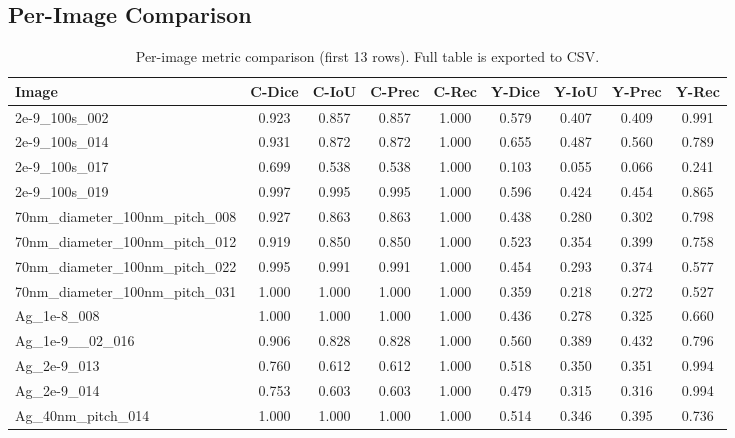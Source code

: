 \documentclass[11pt,a4paper]{article}
\begin{document}
\subsection*{Per-Image Comparison}
\begin{table}[H]
\centering
\scriptsize
\begin{tabular}{lcccccccc}
\toprule
Image & C-Dice & C-IoU & C-Prec & C-Rec & Y-Dice & Y-IoU & Y-Prec & Y-Rec \\
\midrule
2e-9\_100s\_002 & 0.923 & 0.857 & 0.857 & 1.000 & 0.579 & 0.407 & 0.409 & 0.991 \\

2e-9\_100s\_014 & 0.931 & 0.872 & 0.872 & 1.000 & 0.655 & 0.487 & 0.560 & 0.789 \\

2e-9\_100s\_017 & 0.699 & 0.538 & 0.538 & 1.000 & 0.103 & 0.055 & 0.066 & 0.241 \\

2e-9\_100s\_019 & 0.997 & 0.995 & 0.995 & 1.000 & 0.596 & 0.424 & 0.454 & 0.865 \\

70nm\_diameter\_100nm\_pitch\_008 & 0.927 & 0.863 & 0.863 & 1.000 & 0.438 & 0.280 & 0.302 & 0.798 \\

70nm\_diameter\_100nm\_pitch\_012 & 0.919 & 0.850 & 0.850 & 1.000 & 0.523 & 0.354 & 0.399 & 0.758 \\

70nm\_diameter\_100nm\_pitch\_022 & 0.995 & 0.991 & 0.991 & 1.000 & 0.454 & 0.293 & 0.374 & 0.577 \\

70nm\_diameter\_100nm\_pitch\_031 & 1.000 & 1.000 & 1.000 & 1.000 & 0.359 & 0.218 & 0.272 & 0.527 \\

Ag\_1e-8\_008 & 1.000 & 1.000 & 1.000 & 1.000 & 0.436 & 0.278 & 0.325 & 0.660 \\

Ag\_1e-9\_\_02\_016 & 0.906 & 0.828 & 0.828 & 1.000 & 0.560 & 0.389 & 0.432 & 0.796 \\

Ag\_2e-9\_013 & 0.760 & 0.612 & 0.612 & 1.000 & 0.518 & 0.350 & 0.351 & 0.994 \\

Ag\_2e-9\_014 & 0.753 & 0.603 & 0.603 & 1.000 & 0.479 & 0.315 & 0.316 & 0.994 \\

Ag\_40nm\_pitch\_014 & 1.000 & 1.000 & 1.000 & 1.000 & 0.514 & 0.346 & 0.395 & 0.736 \\
\bottomrule
\end{tabular}
\caption{Per-image metric comparison (first 13 rows). Full table is exported to CSV.}
\end{table}
\end{document}
